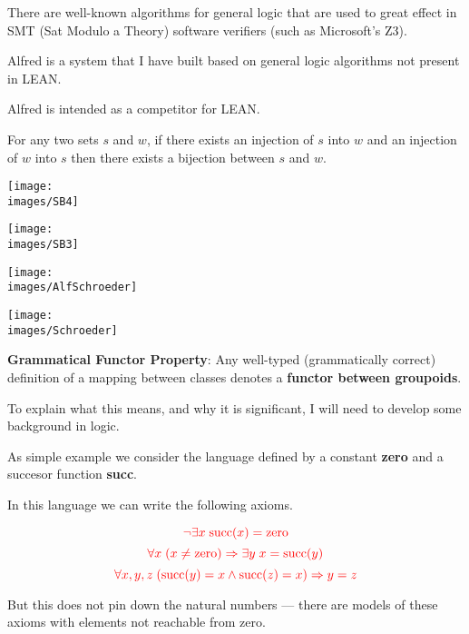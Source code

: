 {There are well-known algorithms for general logic that are used to great effect in SMT (Sat Modulo a Theory) software verifiers
(such as Microsoft's Z3).

\vfill
Alfred is a system that I have built based on general logic algorithms not present in LEAN.

\vfill
Alfred is intended as a competitor for LEAN.


For any two sets $s$ and $w$, if there exists an injection of $s$ into $w$ and an injection of $w$ into $s$ then there exists a bijection between $s$ and $w$.


\centerline{\texttt{[image: \\images/SB4]}}


\centerline{\texttt{[image: \\images/SB3]}}



\centerline{\texttt{[image: \\images/AlfSchroeder]}}


\centerline{\texttt{[image: \\images/Schroeder]}}


{\bf Grammatical Functor Property}: Any well-typed (grammatically correct) definition of a mapping between classes denotes a {\bf functor between groupoids}.

\vfill
To explain what this means, and why it is significant, I will need to develop some background in logic.


As simple example we consider the language defined by a constant {\bf zero} and a succesor function {\bf succ}.

\vfill
In this language we can write the following axioms.

$${\color{red} \neg \exists x \;\mathrm{succ}(x) = \mathrm{zero}}$$
$${\color{red} \forall x\; (x \neq \mathrm{zero}) \Rightarrow \exists y\; x = \mathrm{succ}(y)}$$
$${\color{red}\forall x,y,z \;(\mathrm{succ}(y)= x \wedge \mathrm{succ}(z)= x) \Rightarrow y=z}$$

\vfill
But this does not pin down the natural numbers --- there are models of these axioms with
elements not reachable from zero.

}
